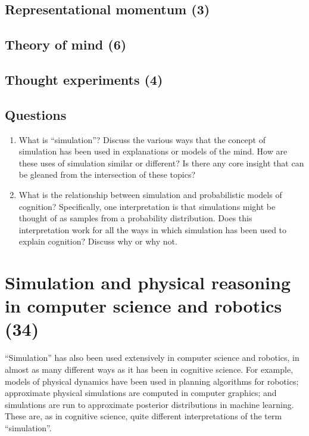 \documentclass{article}
\begin{document}
\subsection{Representational momentum (3)}

\subsection{Theory of mind (6)}

\subsection{Thought experiments (4)}

\subsection{Questions}

\begin{enumerate}
\item What is ``simulation''? Discuss the various ways that the concept of simulation has been used in explanations or models of the mind. How are these uses of simulation similar or different? Is there any core insight that can be gleaned from the intersection of these topics?
\item What is the relationship between simulation and probabilistic models of cognition? Specifically, one interpretation is that simulations might be thought of as samples from a probability distribution. Does this interpretation work for all the ways in which simulation has been used to explain cognition? Discuss why or why not.
\end{enumerate}


\newpage
\section{Simulation and physical reasoning in computer science and robotics (34)}

``Simulation'' has also been used extensively in computer science and robotics, in almost as many different ways as it has been in cognitive science.
For example, models of physical dynamics have been used in planning algorithms for robotics; approximate physical simulations are computed in computer graphics; and simulations are run to approximate posterior distributions in machine learning.
These are, as in cognitive science, quite different interpretations of the term ``simulation''.
\end{document}
